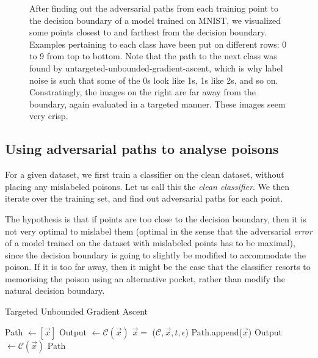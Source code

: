 \documentclass{ociamthesis}
\begin{document}
\begin{figure}
    \caption{After finding out the adversarial paths from each training point to
    the decision boundary of a model trained on MNIST, we visualized some points
    closest to and farthest from the decision boundary. Examples pertaining to
    each class have been put on different rows: 0 to 9 from top to bottom. Note
    that the path to the next class was found by
    untargeted-unbounded-gradient-ascent, which is why label noise is such that
    some of the 0s look like 1s, 1s like 2s, and so on. Constratingly, the
    images on the right are far away from the boundary, again evaluated in a
    targeted manner. These images seem very crisp.}
    \label{fig:pgd-path-examples}
\end{figure}


\subsection{Using adversarial paths to analyse poisons}

For a given dataset, we first train a classifier on the clean dataset, without
placing any mislabeled poisons. Let us call this the \emph{clean classifier}. We
then iterate over the training set, and find out adversarial paths for each
point.

The hypothesis is that if points are too close to the decision boundary, then it
is not very optimal to mislabel them (optimal in the sense that the adversarial
\emph{error} of a model trained on the dataset with mislabeled points has to be
maximal), since the decision boundary is going to slightly be modified to
accommodate the poison. If it is too far away, then it might be the case that
the classifier resorts to memorising the poison using an alternative pocket,
rather than modify the natural decision boundary.

\begin{algorithm}[!h]
\caption{Targeted Unbounded Gradient Ascent}
\begin{algorithmic}[1]
    \State Path $\gets [\vec{x}]$
    \State Output $\gets \mathcal{C}(\vec{x})$
        \State $\vec{x} =$ ($\mathcal{C}, \vec{x}, t, \epsilon$)
        \State Path.append($\vec{x}$)
        \State Output $\gets \mathcal{C}(\vec{x})$
    \EndWhile
    \State \Return Path
    \label{algorithm:unbounded-gd}
\EndProcedure

\end{algorithmic}
\end{algorithm}
\end{document}
